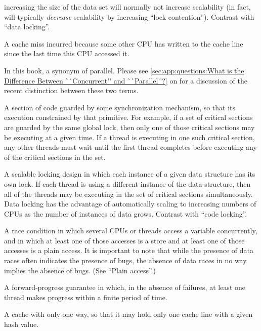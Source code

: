 \begin{description}
	increasing the size of the data set will normally not increase
	scalability (in fact, will typically \emph{decrease} scalability
	by increasing ``lock contention'').
	Contrast with ``data locking''.
\item[\IXalth{Communication Miss}{communication}{cache miss}:]
	A cache miss incurred because some other CPU has written to
	the cache line since the last time this CPU accessed it.
\item[\IX{Concurrent}:]
	In this book, a synonym of parallel.
	Please see \cref{sec:app:questions:What is the Difference Between ``Concurrent'' and ``Parallel''?}
	on 
	for a discussion of the recent distinction between these two
	terms.
\item[\IX{Critical Section}:]
	A section of code guarded by some synchronization mechanism,
	so that its execution constrained by that primitive.
	For example, if a set of critical sections are guarded by
	the same global lock, then only one of those critical sections
	may be executing at a given time.
	If a thread is executing in one such critical section,
	any other threads must wait until the first thread completes
	before executing any of the critical sections in the set.
\item[\IXh{Data}{Locking}:]
	A scalable locking design in which each instance of a given
	data structure has its own lock.
	If each thread is using a different instance of the
	data structure, then all of the threads may be executing in
	the set of critical sections simultaneously.
	Data locking has the advantage of automatically scaling to
	increasing numbers of CPUs as the number of instances of
	data grows.
	Contrast with ``code locking''.
\item[\IX{Data Race}:]
	A race condition in which several CPUs or threads access
	a variable concurrently, and in which at least one of those
	accesses is a store and at least one of those accesses
	is a plain access.
	It is important to note that while the presence of data races
	often indicates the presence of bugs, the absence of data races
	in no way implies the absence of bugs.
	(See ``Plain access''.)
\item[\IX{Deadlock Free}:]
	A forward-progress guarantee in which, in the absence of
	failures, at least one thread makes progress within a finite
	period of time.
\item[\IXh{Direct-Mapped}{Cache}:]
	A cache with only one way, so that it may hold only one cache
	line with a given hash value.

\end{description}
